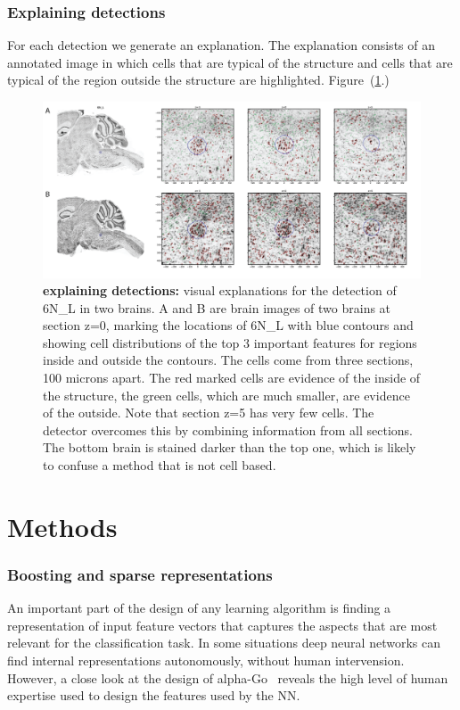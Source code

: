 \documentclass[11pt]{article}
\begin{document}
\subsubsection{Explaining detections}
For each detection we generate an explanation. The explanation
consists of an annotated image in which cells that are typical of the
structure and cells that are typical of the region outside the
structure are highlighted. Figure~(\ref{fig:explaining}.)

\begin{figure}[t]
  \includegraphics[width=\textwidth]{figures/DetectionExplanation.png}
  \caption{\label{fig:explaining} {\bf explaining detections:} visual explanations for the
    detection of 6N\_L in two brains. A and B are brain images of two
    brains at section z=0, marking the locations of 6N\_L with blue
    contours and showing cell distributions of the top 3 important
    features for regions inside and outside the contours.  The cells
    come from three sections, 100 microns apart. The red marked cells
    are evidence of the inside of the structure, the green cells,
    which are much smaller, are evidence of the outside. Note that
    section z=5 has very few cells. The detector overcomes this by
    combining information from all sections.  The bottom brain is
    stained darker than the top one, which is likely to confuse a
    method that is not cell based.}
  \end{figure}


  \section{Methods}

  \subsubsection{Boosting and sparse representations}
An important part of the design of any learning algorithm is finding a
representation of input feature vectors that captures the aspects that are
most relevant for the classification task. In some situations deep
neural networks can find internal representations autonomously,
without human intervension. However, a close look at the design of
alpha-Go~\cite{silver2017mastering} reveals the high level of human
expertise used to design the features used by the NN.
\end{document}
